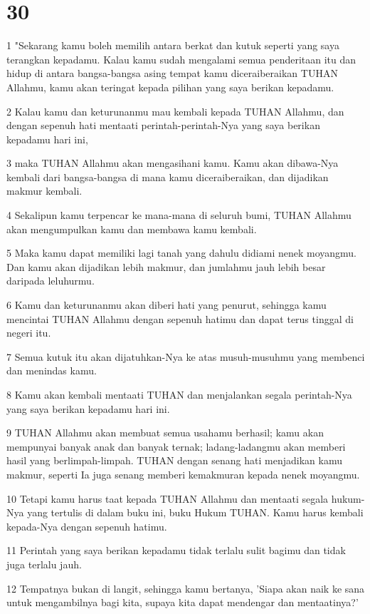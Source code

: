 \chapter{30}

\par 1 "Sekarang kamu boleh memilih antara berkat dan kutuk seperti yang saya terangkan kepadamu. Kalau kamu sudah mengalami semua penderitaan itu dan hidup di antara bangsa-bangsa asing tempat kamu diceraiberaikan TUHAN Allahmu, kamu akan teringat kepada pilihan yang saya berikan kepadamu.
\par 2 Kalau kamu dan keturunanmu mau kembali kepada TUHAN Allahmu, dan dengan sepenuh hati mentaati perintah-perintah-Nya yang saya berikan kepadamu hari ini,
\par 3 maka TUHAN Allahmu akan mengasihani kamu. Kamu akan dibawa-Nya kembali dari bangsa-bangsa di mana kamu diceraiberaikan, dan dijadikan makmur kembali.
\par 4 Sekalipun kamu terpencar ke mana-mana di seluruh bumi, TUHAN Allahmu akan mengumpulkan kamu dan membawa kamu kembali.
\par 5 Maka kamu dapat memiliki lagi tanah yang dahulu didiami nenek moyangmu. Dan kamu akan dijadikan lebih makmur, dan jumlahmu jauh lebih besar daripada leluhurmu.
\par 6 Kamu dan keturunanmu akan diberi hati yang penurut, sehingga kamu mencintai TUHAN Allahmu dengan sepenuh hatimu dan dapat terus tinggal di negeri itu.
\par 7 Semua kutuk itu akan dijatuhkan-Nya ke atas musuh-musuhmu yang membenci dan menindas kamu.
\par 8 Kamu akan kembali mentaati TUHAN dan menjalankan segala perintah-Nya yang saya berikan kepadamu hari ini.
\par 9 TUHAN Allahmu akan membuat semua usahamu berhasil; kamu akan mempunyai banyak anak dan banyak ternak; ladang-ladangmu akan memberi hasil yang berlimpah-limpah. TUHAN dengan senang hati menjadikan kamu makmur, seperti Ia juga senang memberi kemakmuran kepada nenek moyangmu.
\par 10 Tetapi kamu harus taat kepada TUHAN Allahmu dan mentaati segala hukum-Nya yang tertulis di dalam buku ini, buku Hukum TUHAN. Kamu harus kembali kepada-Nya dengan sepenuh hatimu.
\par 11 Perintah yang saya berikan kepadamu tidak terlalu sulit bagimu dan tidak juga terlalu jauh.
\par 12 Tempatnya bukan di langit, sehingga kamu bertanya, 'Siapa akan naik ke sana untuk mengambilnya bagi kita, supaya kita dapat mendengar dan mentaatinya?'
